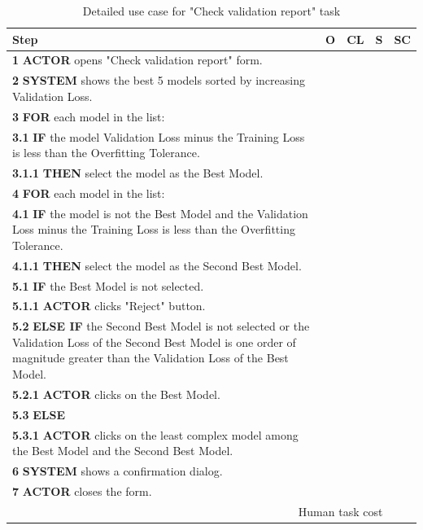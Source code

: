\begin{table}[H]
\centering
\begin{tabularx}{\textwidth}{|X|c|c|c|c|}
\hline
\textbf{Step} & \textbf{O} & \textbf{CL} & \textbf{S} & \textbf{SC} \\
\hline
\textbf{1} \textbf{ACTOR} opens "Check validation report" form. & & & & \\
\hline
\textbf{2} \textbf{SYSTEM} shows the best 5 models sorted by increasing Validation Loss. & & & & \\
\hline
\textbf{3} \textbf{FOR} each model in the list: & & & & \\
\hline
\textbf{3.1} \textbf{IF} the model Validation Loss minus the Training Loss is less than the Overfitting Tolerance. & & & & \\
\hline
\textbf{3.1.1} \textbf{THEN} select the model as the Best Model. & & & & \\
\hline
\textbf{4} \textbf{FOR} each model in the list: & & & & \\
\hline
\textbf{4.1} \textbf{IF} the model is not the Best Model and the Validation Loss minus the Training Loss is less than the Overfitting Tolerance. & & & & \\
\hline
\textbf{4.1.1} \textbf{THEN} select the model as the Second Best Model. & & & & \\
\hline
\textbf{5.1} \textbf{IF} the Best Model is not selected. & & & & \\
\hline
\textbf{5.1.1} \textbf{ACTOR} clicks "Reject" button. & & & & \\
\hline
\textbf{5.2} \textbf{ELSE IF} the Second Best Model is not selected or the Validation Loss of the Second Best Model is one order of magnitude greater than the Validation Loss of the Best Model. & & & & \\
\hline
\textbf{5.2.1} \textbf{ACTOR} clicks on the Best Model. & & & & \\
\hline
\textbf{5.3} \textbf{ELSE} & & & & \\
\hline
\textbf{5.3.1} \textbf{ACTOR} clicks on the least complex model among the Best Model and the Second Best Model. & & & & \\
\hline
\textbf{6} \textbf{SYSTEM} shows a confirmation dialog. & & & & \\
\hline
\textbf{7} \textbf{ACTOR} closes the form. & & & & \\
\hline
\multicolumn{4}{|r|}{Human task cost} & \\
\hline
\end{tabularx}
\caption{Detailed use case for "Check validation report" task}
\label{table:check_validation_report}
\end{table}

